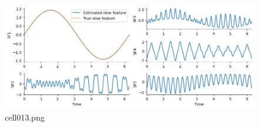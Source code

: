 \begin{figure}[ht]
	\centering
	\includegraphics[scale=0.8, max width=\linewidth]{./fig/appendix/slow-feature-analysis/cell013.png}
	\caption{cell013.png}
	\label{cell013.png}
\end{figure}